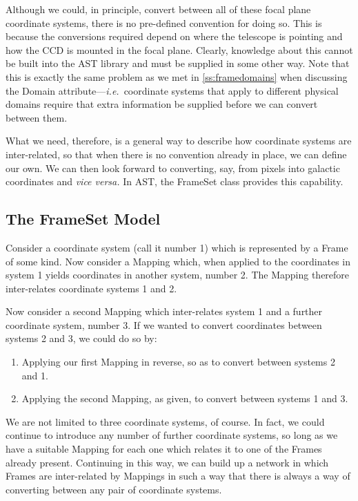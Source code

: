 \documentclass[twoside,11pt]{article}
\newcommand{\htmlref}[2]{#1}
\newcommand{\secref}[1]{\S\ref{#1}}
\renewcommand{\secref}[1]{\ref{#1}}
\begin{document}
Although we could, in principle, convert between all of these focal
plane coordinate systems, there is no pre-defined convention for doing
so. This is because the conversions required depend on where the
telescope is pointing and how the CCD is mounted in the focal
plane. Clearly, knowledge about this cannot be built into the AST
library and must be supplied in some other way. Note that this is
exactly the same problem as we met in \secref{ss:framedomains} when
discussing the \htmlref{Domain}{Domain} attribute---{\em{i.e.}}\ coordinate systems that
apply to different physical domains require that extra information be
supplied before we can convert between them.

What we need, therefore, is a general way to describe how coordinate
systems are inter-related, so that when there is no convention already
in place, we can define our own. We can then look forward to
converting, say, from pixels into galactic coordinates and {\em{vice
versa.}}  In AST, the \htmlref{FrameSet}{FrameSet} class provides this capability.

\subsection{The FrameSet Model}

Consider a coordinate system (call it number 1) which is represented
by a \htmlref{Frame}{Frame} of some kind. Now consider a \htmlref{Mapping}{Mapping} which, when applied to
the coordinates in system 1 yields coordinates in another system,
number 2. The Mapping therefore inter-relates coordinate systems 1 and
2.

Now consider a second Mapping which inter-relates system 1 and a
further coordinate system, number 3. If we wanted to convert
coordinates between systems 2 and 3, we could do so by:

\begin{enumerate}
\item Applying our first Mapping in reverse, so as to convert between
systems 2 and 1.

\item Applying the second Mapping, as given, to convert between
systems 1 and 3.
\end{enumerate}

We are not limited to three coordinate systems, of course. In fact, we
could continue to introduce any number of further coordinate systems,
so long as we have a suitable Mapping for each one which relates it to
one of the Frames already present. Continuing in this way, we can
build up a network in which Frames are inter-related by Mappings in
such a way that there is always a way of converting between any pair
of coordinate systems.
\end{document}
